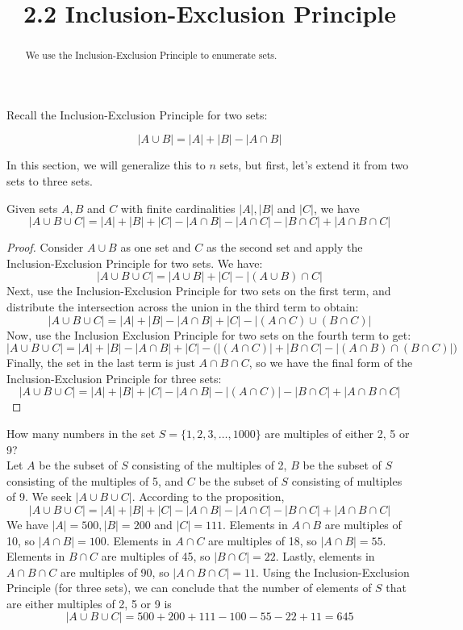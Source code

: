 \documentclass[handout]{ximera}
\title{2.2 Inclusion-Exclusion Principle}
\begin{document}
\begin{abstract}
We use the Inclusion-Exclusion Principle to enumerate sets.
\end{abstract}

\maketitle


Recall the Inclusion-Exclusion Principle for two sets:

\[
|A \cup B| = |A| + |B| - |A \cap B|
\]

In this section, we will generalize this to $n$ sets, but first, let's extend it from two sets to three sets.

\begin{proposition}
Given sets $A, B$ and $C$ with finite cardinalities $|A|, |B|$ and $|C|$, we have
\[
|A \cup B \cup C| = |A| + |B| + |C| - |A \cap B| - |A \cap C| - |B \cap C| + |A \cap B \cap C|
\]
\end{proposition}




\begin{proof}
Consider $A \cup B$ as one set and $C$ as the second set and apply the 
Inclusion-Exclusion Principle for two sets.  We have:
\[
|A \cup B \cup C| = |A \cup B| + |C| - | (A\cup B) \cap C|
\]
Next, use the Inclusion-Exclusion Principle for two sets on the first term, and 
distribute the intersection across the union in the third term to obtain:
\[
|A \cup B \cup C| = |A| + |B| - |A \cap B| + |C| - | (A \cap C) \cup (B\cap C) |
\]
Now, use the Inclusion Exclusion Principle for two sets on the fourth term to get:
\[
|A \cup B \cup C| = |A| + |B| - |A \cap B| + |C| - \bigg(| (A \cap C)| + |B\cap C| - |(A\cap B) \cap (B\cap C)| \bigg)
\]
Finally, the set in the last term is just $A \cap B \cap C$, so we have the final form of the 
Inclusion-Exclusion Principle for three sets:
\[
|A \cup B \cup C| = |A| + |B| + |C| - |A \cap B| - | (A \cap C)| - |B\cap C| +|A\cap B\cap C|
\]
\end{proof}

\begin{example}[example 1]
How many numbers in the set $S = \{1,2,3, \ldots, 1000\}$ are multiples of either 2, 5 or 9?\\
Let $A$ be the subset of $S$ consisting of the multiples of 2, $B$ be the subset of $S$ consisting of the multiples of 5,
and $C$ be the subset of $S$ consisting of multiples of 9.
We seek $|A \cup B \cup C|$. According to the proposition, 
\[
|A \cup B \cup C| = |A| + |B| +|C| - |A \cap B|- |A \cap C|- |B \cap C| + |A \cap B \cap C|
\]
We have $|A| =500,|B| = 200$ and $|C| = 111$. Elements in $A \cap B$ are multiples of 10, so $|A\cap B| = 100$.
Elements in $A \cap C$ are multiples of 18, so $|A\cap B| = 55$.
Elements in $B \cap C$ are multiples of 45, so $|B\cap C| = 22$.  
Lastly, elements in $A \cap B \cap C$ are multiples of 90, so $|A \cap B\cap C| = 11$. 
Using the Inclusion-Exclusion Principle (for three sets), we can conclude 
that the number of elements of $S$ that are either multiples of 2, 5 or 9 is
\[
|A \cup B \cup C| = 500 + 200 + 111 - 100 - 55 -22 + 11 = 645
\]
\end{example}
\end{document}
